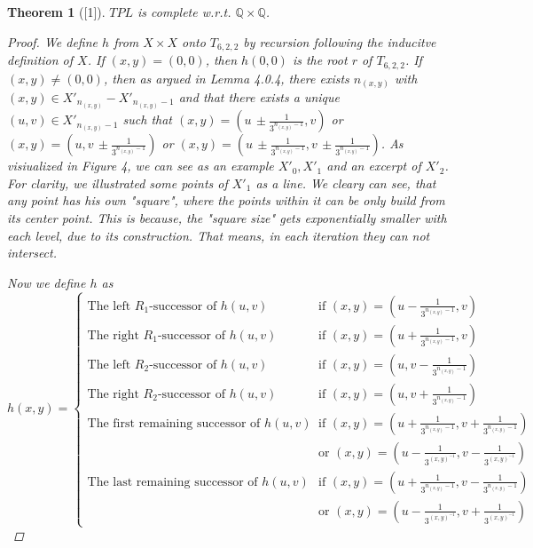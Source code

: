 \documentclass[12pt, a4paper]{scrartcl}
\newtheorem{theorem}[definition]{Theorem}
\begin{document}
\begin{theorem}[\textnormal{[1]}]
    $TPL$ is complete w.r.t. $\mathbb{Q} \times \mathbb{Q}$.

    \begin{proof}
        We define $h$ from $X \times X$ onto $T_{6,2,2}$ by recursion following the inducitve definition of $X$.
        If $(x,y) = (0,0)$, then $h(0,0)$ is the root $r$ of $T_{6,2,2}$. If $(x,y) \neq (0,0)$, then as argued in Lemma 4.0.4, there exists
        $n_{(x,y)}$ with $(x,y) \in X'_{n_{(x,y)}} - X'_{n_{(x,y)}-1}$ and that there exists a unique $(u,v) \in X'_{n_{(x,y)}-1}$ such that 
        $(x,y) =  (u \, \pm \frac{1}{3^{n_{(x,y)}-1}}, v)$ or $(x,y) =  (u, v \, \pm \frac{1}{3^{n_{(x,y)}-1}})$
        or $(x,y) =  (u \, \pm \frac{1}{3^{n_{(x,y)}-1}}, v \, \pm \frac{1}{3^{n_{(x,y)}-1}})$. \newline 
        As visiualized in Figure 4, we can see as an example $X'_0,X'_1$ and an excerpt of $X'_2$. For clarity, we illustrated some points of $X'_1$ as a line. We cleary can see, 
        that any point has his own "square", where the points within it can be only build from its center point. This is because, the "square size" gets exponentially smaller with each level, due to its construction.
        That means, in each iteration they can not intersect.

        Now we define $h$ as 
        \[
            h(x,y) = 
            \begin{cases}
                \mbox{The left } R_1 \mbox{-successor of } h(u,v)  &\mbox{if } (x,y) = (u- \frac{1}{3^{n_{(x,y)}-1}},v) \\
                \mbox{The right } R_1 \mbox{-successor of } h(u,v)  &\mbox{if } (x,y) = (u+ \frac{1}{3^{n_{(x,y)}-1}},v) \\
                \mbox{The left } R_2 \mbox{-successor of } h(u,v)  &\mbox{if } (x,y) = (u, v - \frac{1}{3^{n_{(x,y)}-1}}) \\
                \mbox{The right } R_2 \mbox{-successor of } h(u,v)  &\mbox{if } (x,y) = (u, v + \frac{1}{3^{n_{(x,y)}-1}}) \\
                \mbox{The first remaining successor of } h(u,v)  &\mbox{if } (x,y) = (u+ \frac{1}{3^{n_{(x,y)}-1}}, v+ \frac{1}{3^{n_{(x,y)}-1}}) \\
                \quad &\text{or } (x, y) = (u - \frac{1}{3^{(x,y)^{-1}}}, v - \frac{1}{3^{(x,y)^{-1}}}) \\
                \mbox{The last remaining successor of } h(u,v)  &\mbox{if } (x,y) = (u+ \frac{1}{3^{n_{(x,y)}-1}}, v- \frac{1}{3^{n_{(x,y)}-1}}) \\
                \quad &\text{or } (x, y) = (u - \frac{1}{3^{(x,y)^{-1}}}, v + \frac{1}{3^{(x,y)^{-1}}}) 
                


\end{cases}\]
\end{proof}
\end{theorem}
\end{document}
